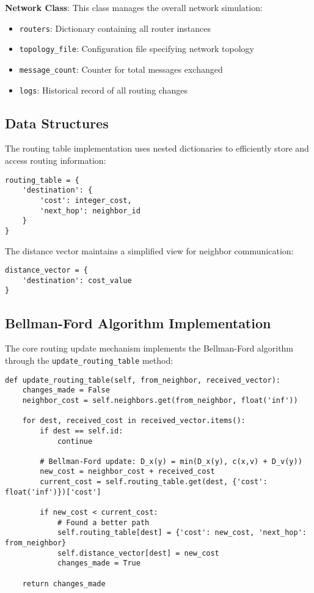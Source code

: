\documentclass[12pt,a4paper]{article}
\begin{document}
\textbf{Network Class}: This class manages the overall network simulation:
\begin{itemize}
\item \texttt{routers}: Dictionary containing all router instances
\item \texttt{topology\_file}: Configuration file specifying network topology
\item \texttt{message\_count}: Counter for total messages exchanged
\item \texttt{logs}: Historical record of all routing changes
\end{itemize}

\subsection{Data Structures}

The routing table implementation uses nested dictionaries to efficiently store and access routing information:

\begin{lstlisting}[caption={Routing Table Data Structure}]
routing_table = {
    'destination': {
        'cost': integer_cost,
        'next_hop': neighbor_id
    }
}
\end{lstlisting}

The distance vector maintains a simplified view for neighbor communication:

\begin{lstlisting}[caption={Distance Vector Structure}]
distance_vector = {
    'destination': cost_value
}
\end{lstlisting}

\subsection{Bellman-Ford Algorithm Implementation}

The core routing update mechanism implements the Bellman-Ford algorithm through the \texttt{update\_routing\_table} method:

\begin{lstlisting}[caption={Bellman-Ford Update Implementation}]
def update_routing_table(self, from_neighbor, received_vector):
    changes_made = False
    neighbor_cost = self.neighbors.get(from_neighbor, float('inf'))
    
    for dest, received_cost in received_vector.items():
        if dest == self.id:
            continue
        
        # Bellman-Ford update: D_x(y) = min(D_x(y), c(x,v) + D_v(y))
        new_cost = neighbor_cost + received_cost
        current_cost = self.routing_table.get(dest, {'cost': float('inf')})['cost']
        
        if new_cost < current_cost:
            # Found a better path
            self.routing_table[dest] = {'cost': new_cost, 'next_hop': from_neighbor}
            self.distance_vector[dest] = new_cost
            changes_made = True
    
    return changes_made
\end{lstlisting}
\end{document}
